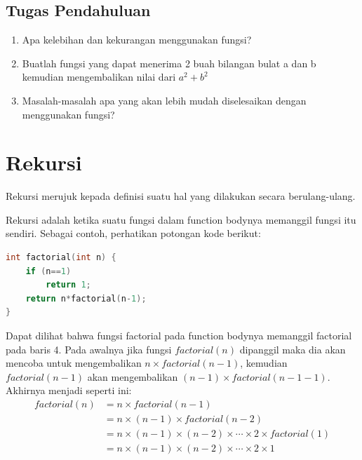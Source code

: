 \subsection{Tugas Pendahuluan}
\begin{enumerate}
    \item Apa kelebihan dan kekurangan menggunakan fungsi?
    \item Buatlah fungsi yang dapat menerima 2 buah bilangan bulat a dan b kemudian mengembalikan nilai dari $a^2 + b^2$
    \item Masalah-masalah apa yang akan lebih mudah diselesaikan dengan menggunakan fungsi?
\end{enumerate}

\section{Rekursi}
Rekursi merujuk kepada definisi suatu hal yang dilakukan secara berulang-ulang.

Rekursi adalah ketika suatu fungsi dalam function bodynya memanggil fungsi itu sendiri.
Sebagai contoh, perhatikan potongan kode berikut:
\begin{lstlisting}[language=c,caption = Factorial dengan rekursi,label=lst:recursionexample01]
int factorial(int n) {
    if (n==1)
        return 1;
    return n*factorial(n-1);
}
\end{lstlisting}
Dapat dilihat bahwa fungsi factorial pada function bodynya memanggil factorial pada baris 4.
Pada awalnya jika fungsi $factorial(n)$ dipanggil maka dia akan mencoba untuk mengembalikan
$n\times factorial(n-1)$, kemudian $factorial(n-1)$ akan mengembalikan $(n-1)\times factorial(n-1-1)$.
Akhirnya menjadi seperti ini:
\begin{equation*}
    \begin{split}
        factorial(n)& = n \times factorial(n-1)\\
        & = n \times (n-1) \times factorial(n-2)\\
        & = n \times (n-1) \times (n-2) \times \cdots \times 2 \times factorial(1)\\
        & = n \times (n-1) \times (n-2) \times \cdots \times 2 \times 1\\
    \end{split}
\end{equation*}


